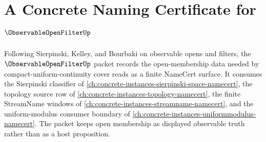 \chapter{A Concrete Naming Certificate for $\ObservableOpenFilterUp$}
\label{ch:concrete-instances-observable-open-filter-namecert}

Following Sierpinski, Kelley, and Bourbaki on observable opens and filters, the $\ObservableOpenFilterUp$ packet records the open-membership data needed by compact-uniform-continuity cover reads as a finite NameCert surface. It consumes the Sierpinski classifier of \autoref{ch:concrete-instances-sierpinski-space-namecert}, the topology source row of \autoref{ch:concrete-instances-topology-namecert}, the finite StreamName windows of \autoref{ch:concrete-instances-streamname-namecert}, and the uniform-modulus consumer boundary of \autoref{ch:concrete-instances-uniformmodulus-namecert}. The packet keeps open membership as displayed observable truth rather than as a host proposition.

